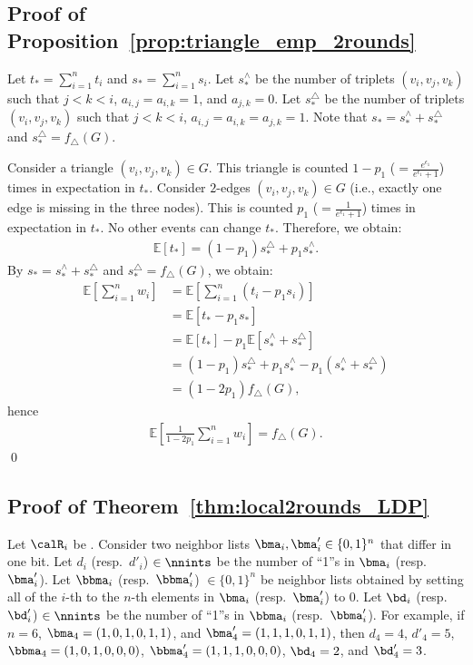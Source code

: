 \subsection{Proof of Proposition~\ref{prop:triangle_emp_2rounds}}
Let $t_* = \sum_{i=1}^n t_i$ and $s_* = \sum_{i=1}^n s_i$. 
Let $s_*^{\wedge}$ be the number of triplets $(v_i,v_j,v_k)$ such that $j<k<i$, $a_{i,j} = a_{i,k} = 1$, and $a_{j,k} = 0$. 
Let $s_*^{\triangle}$ be the number of triplets $(v_i,v_j,v_k)$ such that $j<k<i$, $a_{i,j} = a_{i,k} = a_{j,k} =1$. 
Note that 
$s_* = s_*^{\wedge} + s_*^{\triangle}$ and 
$s_*^{\triangle} = f_\triangle(G)$. 

Consider a triangle $(v_i,v_j,v_k) \in G$. 
This triangle is counted $1-p_1$ ($= \frac{e^{\epsilon_1}}{e^{\epsilon_1}+1}$) times in expectation in $t_*$. 
Consider $2$-edges $(v_i,v_j,v_k) \in G$ (i.e., exactly one edge is missing in the three nodes). 
This is counted $p_1$ ($= \frac{1}{e^{\epsilon_1}+1}$) times in expectation in $t_*$.  
No other events can change $t_*$. 
Therefore, we obtain:
\begin{align*}
\mathbb{E}[t_*] = (1-p_1) s_*^{\triangle} + p_1 s_*^{\wedge}. 
\end{align*}
By $s_* = s_*^{\wedge} + s_*^{\triangle}$ and 
$s_*^{\triangle} = f_\triangle(G)$, we obtain:
\begin{align*}
\mathbb{E}\left[\sum_{i=1}^n w_i \right] 
&= \mathbb{E}\left[\sum_{i=1}^n (t_i - p_1 s_i) \right] \\
&= \mathbb{E}[t_* - p_1 s_*] \\
&= \mathbb{E}[t_*] - p_1 \mathbb{E}[s_*^{\wedge} + s_*^{\triangle}] \\
&= (1-p_1) s_*^{\triangle} + p_1 s_*^{\wedge} - p_1 (s_*^{\wedge} + s_*^{\triangle}) \\
&= (1 - 2 p_1) f_\triangle(G),
\end{align*}
hence 
\begin{align*}
\textstyle{\mathbb{E}\left[ \frac{1}{1-2p_1} \sum_{i=1}^n w_i \right] = f_\triangle(G).}
\end{align*}
\qed

\subsection{Proof of Theorem~\ref{thm:local2rounds_LDP}}
Let $\calR_i$ be . 
Consider two neighbor lists $\bma_i,\bma'_i \in \{0,1\}^n$ that differ in one bit. 
Let $d_i$ (resp.~$d'_i$) $\in \nnints$ be the number of ``1''s in $\bma_i$ (resp.~$\bma'_i$). 
Let $\bbma_i$ (resp.~$\bbma'_i$) $\in \{0,1\}^n$ be neighbor lists obtained by setting all of the $i$-th to the $n$-th elements in $\bma_i$ (resp.~$\bma'_i$) to $0$. 
Let $\bd_i$ (resp.~$\bd'_i$) $\in \nnints$ be the number of ``1''s in $\bbma_i$ (resp.~$\bbma'_i$). 
For example, if $n=6$, $\bma_4=(1,0,1,0,1,1)$, and $\bma'_4=(1,1,1,0,1,1)$, then 
$d_4=4$, $d'_4=5$, $\bbma_4=(1,0,1,0,0,0)$, $\bbma'_4=(1,1,1,0,0,0)$, $\bd_4=2$, and $\bd'_4=3$. 

